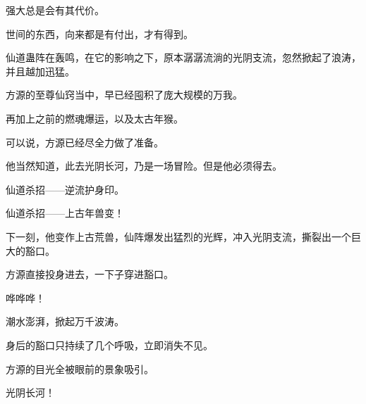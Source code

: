 \begin{this_body}
强大总是会有其代价。

世间的东西，向来都是有付出，才有得到。

仙道蛊阵在轰鸣，在它的影响之下，原本潺潺流淌的光阴支流，忽然掀起了浪涛，并且越加迅猛。

方源的至尊仙窍当中，早已经囤积了庞大规模的万我。

再加上之前的燃魂爆运，以及太古年猴。

可以说，方源已经尽全力做了准备。

他当然知道，此去光阴长河，乃是一场冒险。但是他必须得去。

仙道杀招——逆流护身印。

仙道杀招——上古年兽变！

下一刻，他变作上古荒兽，仙阵爆发出猛烈的光辉，冲入光阴支流，撕裂出一个巨大的豁口。

方源直接投身进去，一下子穿进豁口。

哗哗哗！

潮水澎湃，掀起万千波涛。

身后的豁口只持续了几个呼吸，立即消失不见。

方源的目光全被眼前的景象吸引。

光阴长河！

\end{this_body}

